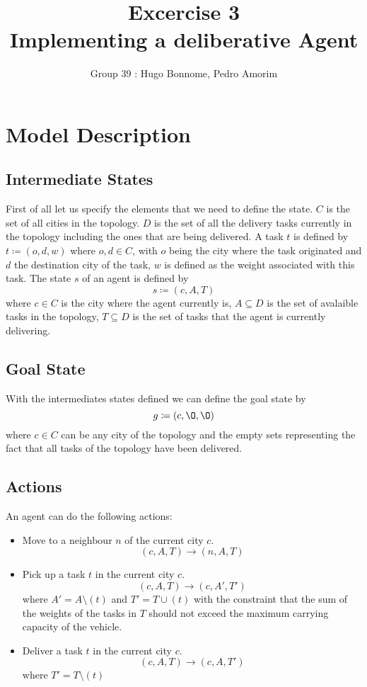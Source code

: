 \documentclass[11pt]{article}
\title{\bf Excercise 3\\ Implementing a deliberative Agent}
\author{Group 39 : Hugo Bonnome, Pedro Amorim}
\begin{document}
\maketitle

\section{Model Description}

\subsection{Intermediate States}
First of all let us specify the elements that we need to define the state.
$ C $ is the set of all cities in the topology. $ D $ is the set of all the
delivery tasks currently in the topology including the ones that are being
delivered.
A task $ t $ is defined by $ t \coloneqq (o, d, w) $ where $ o, d \in C $, with
$ o $ being the city where the task originated and $ d $ the destination city of
the task, $ w $ is defined as the weight associated with this task. The state $
s $ of an agent is defined by $$ s \coloneqq (c, A, T) $$ where $c \in C$ is the
city where the agent currently is, $ A \subseteq D $ is the set of avalaible
tasks in the topology, $ T \subseteq D $ is the set of tasks that the agent is
currently delivering.

\subsection{Goal State}
With the intermediates states defined we can define the goal state by $$ g
\coloneqq (c, \O, \O) $$ where $ c \in C $ can be any city of the topology and
the empty sets representing the fact that all tasks of the topology have been
delivered.

\subsection{Actions}
An agent can do the following actions:
\begin{itemize}
\item Move to a neighbour $ n $ of the current city $ c $. $$ (c, A, T)
\rightarrow (n, A, T) $$
\item Pick up a task $ t $ in the current city $ c $. $$ (c, A, T) \rightarrow
  (c, A', T') $$ where $ A' = A \setminus (t) $ and $ T' = T \cup (t) $ with the
  constraint that the sum of the weights of the tasks in $ T $ should not exceed
  the maximum carrying capacity of the vehicle.
\item Deliver a task $ t $ in the current city $ c $. $$ (c, A, T) \rightarrow
  (c, A, T') $$ where $ T' = T \setminus (t) $
\end{itemize}
\end{document}
